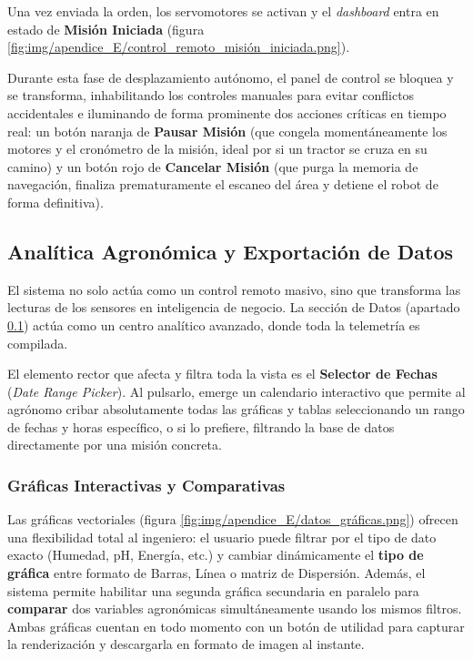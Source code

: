 
Una vez enviada la orden, los servomotores se activan y el \textit{dashboard} entra en estado de \textbf{Misión Iniciada} (figura \ref{fig:img/apendice_E/control_remoto_misión_iniciada.png}).


Durante esta fase de desplazamiento autónomo, el panel de control se bloquea y se transforma, inhabilitando los controles manuales para evitar conflictos accidentales e iluminando de forma prominente dos acciones críticas en tiempo real: un botón naranja de \textbf{Pausar Misión} (que congela momentáneamente los motores y el cronómetro de la misión, ideal por si un tractor se cruza en su camino) y un botón rojo de \textbf{Cancelar Misión} (que purga la memoria de navegación, finaliza prematuramente el escaneo del área y detiene el robot de forma definitiva).

\subsection{Analítica Agronómica y Exportación de Datos}\label{sec:datos}
El sistema no solo actúa como un control remoto masivo, sino que transforma las lecturas de los sensores en inteligencia de negocio. La sección de Datos (apartado \ref{sec:datos}) actúa como un centro analítico avanzado, donde toda la telemetría es compilada.

El elemento rector que afecta y filtra toda la vista es el \textbf{Selector de Fechas} (\textit{Date Range Picker}). Al pulsarlo, emerge un calendario interactivo que permite al agrónomo cribar absolutamente todas las gráficas y tablas seleccionando un rango de fechas y horas específico, o si lo prefiere, filtrando la base de datos directamente por una misión concreta.

\subsubsection{Gráficas Interactivas y Comparativas}
Las gráficas vectoriales (figura \ref{fig:img/apendice_E/datos_gráficas.png}) ofrecen una flexibilidad total al ingeniero: el usuario puede filtrar por el tipo de dato exacto (Humedad, pH, Energía, etc.) y cambiar dinámicamente el \textbf{tipo de gráfica} entre formato de Barras, Línea o matriz de Dispersión. Además, el sistema permite habilitar una segunda gráfica secundaria en paralelo para \textbf{comparar} dos variables agronómicas simultáneamente usando los mismos filtros. Ambas gráficas cuentan en todo momento con un botón de utilidad para capturar la renderización y descargarla en formato de imagen al instante.

